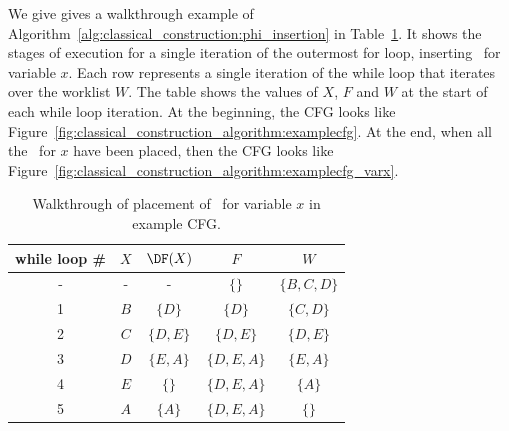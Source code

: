 {We give gives a walkthrough example of 
Algorithm~\ref{alg:classical_construction:phi_insertion} in
Table~\ref{table:classical_construction:walkthru}. 
It shows the stages of execution for a single iteration of
the outermost for loop, inserting \phifuns\
for variable $x$.
Each row represents a single iteration of the while loop
that iterates over the worklist $W$. The table shows the values
of $X$, $F$ and $W$ at the start of each while loop iteration.
At the beginning, the CFG looks like Figure~\ref{fig:classical_construction_algorithm:examplecfg}.
At the end, when all the \phifuns\ for $x$ have
been placed, then the CFG looks like Figure~\ref{fig:classical_construction_algorithm:examplecfg_varx}.



\begin{table}
  {\def\sp{@{\kern1.5em}}
\begin{center}
  \begin{tabular}{c\sp c\sp c\sp c\sp c}
\textbf{while loop \#} & $X$ & $\DF(X)$ & $F$         & $W$\\ \hline
-                      & -   & -                & $\{\}$      & $\{B,C,D\}$ \\
1                      & $B$ & $\{D\}$          & $\{D\}$     & $\{C,D\}$ \\
2                      & $C$ & $\{D,E\}$        & $\{D,E\}$   & $\{D,E\}$ \\
3                      & $D$ & $\{E,A\}$        & $\{D,E,A\}$ & $\{E,A\}$\\
4                      & $E$ & $\{\}$           & $\{D,E,A\}$ & $\{A\}$\\
5                      & $A$ & $\{A\}$          & $\{D,E,A\}$ & $\{\}$\\ 
\end{tabular}
\end{center}
}
\caption{\label{table:classical_construction:walkthru} Walkthrough of
  placement of \phifuns\ for variable $x$ in example CFG.}
\end{table}


}
